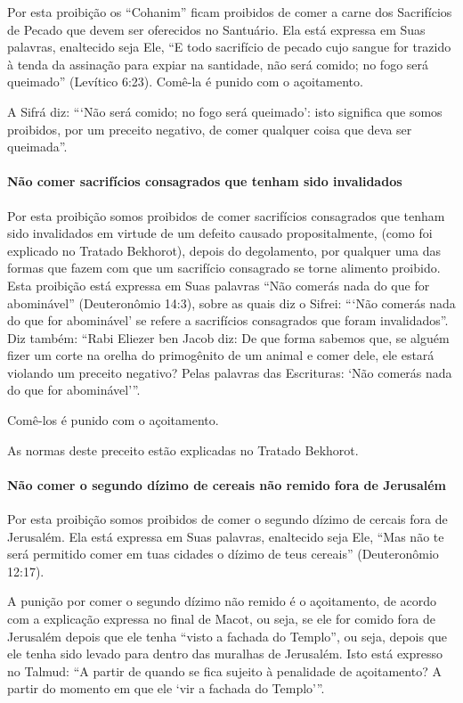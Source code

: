 Por esta proibição os ``Cohanim'' ficam proibidos de comer a carne dos
Sacrifícios de Pecado que devem ser oferecidos no Santuário. Ela está
expressa em Suas palavras, enaltecido seja Ele, ``E todo sacrifício de
pecado cujo sangue for trazido à tenda da assinação para expiar na
santidade, não será comido; no fogo será queimado'' (Levítico 6:23).
Comê-la é punido com o açoitamento.

A Sifrá diz: ```Não será comido; no fogo será queimado': isto significa
que somos proibidos, por um preceito negativo, de comer qualquer coisa
que deva ser queimada''.

\paragraph{Não comer sacrifícios consagrados que tenham sido invalidados}

Por esta proibição somos proibidos de comer sacrifícios consagrados que
tenham sido invalidados em virtude de um defeito causado
propositalmente, (como foi explicado no Tratado Bekhorot), depois do
degolamento, por qualquer uma das formas que fazem com que um sacrifício consagrado se
torne alimento proibido. Esta proibição está expressa em Suas palavras
``Não comerás nada do que for abominável'' (Deuteronômio 14:3), sobre
as quais diz o Sifrei: ```Não comerás nada do que for abominável' se
refere a sacrifícios consagrados que foram invalidados''. Diz também:
``Rabi Eliezer ben Jacob diz: De que forma sabemos que, se alguém fizer
um corte na orelha do primogênito de um animal e comer dele, ele estará
violando um preceito negativo? Pelas palavras das Escrituras: `Não
comerás nada do que for abominável'''.

Comê-los é punido com o açoitamento.

As normas deste preceito estão explicadas no Tratado Bekhorot.

\paragraph{Não comer o segundo dízimo de cereais não remido fora de Jerusalém}

Por esta proibição somos proibidos de comer o segundo dízimo de cercais
fora de Jerusalém. Ela está expressa em Suas palavras, enaltecido seja
Ele, ``Mas não te será permitido comer em tuas cidades o dízimo de teus
cereais'' (Deuteronômio 12:17).

A punição por comer o segundo dízimo não remido é o açoitamento, de
acordo com a explicação expressa no final de Macot, ou seja, se ele for
comido fora de Jerusalém depois que ele tenha ``visto a fachada do
Templo'', ou seja, depois que ele tenha sido levado para dentro das
muralhas de Jerusalém. Isto está expresso no Talmud: ``A partir de
quando se fica sujeito à penalidade de açoitamento? A partir do momento
em que ele `vir a fachada do Templo'''.

